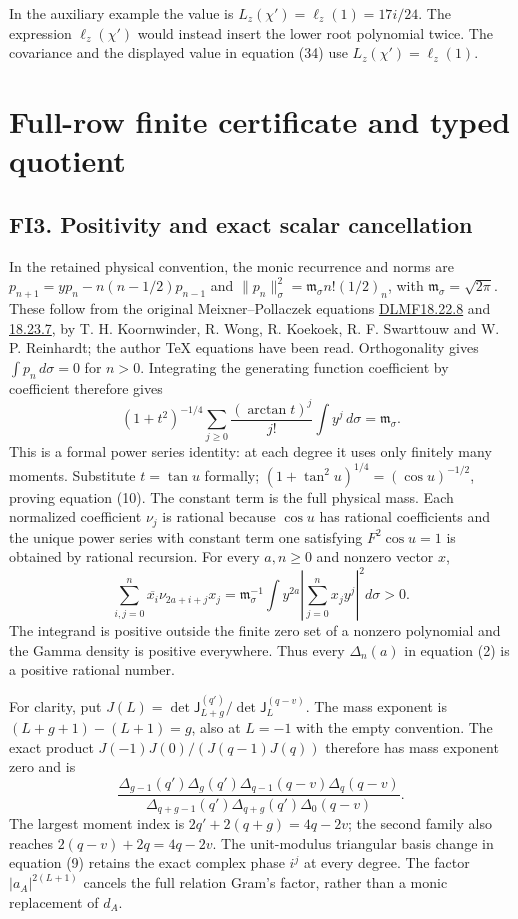 \documentclass[11pt]{article}
\begin{document}
In the auxiliary example the value is \(L_z(\chi')=\ell_z(1)=17i/24\). The expression \(\ell_z(\chi')\) would instead insert the lower root polynomial twice. The covariance and the displayed value in equation (34) use \(L_z(\chi')=\ell_z(1)\).

\section{Full-row finite certificate and typed quotient}\label{full-row-finite-certificate-and-typed-quotient}

\subsection{FI3. Positivity and exact scalar cancellation}\label{fi3.-positivity-and-exact-scalar-cancellation}

In the retained physical convention, the monic recurrence and norms are \(p_{n+1}=yp_n-n(n-1/2)p_{n-1}\) and \(\|p_n\|_\sigma^2=\mathfrak m_\sigma n!(1/2)_n\), with \(\mathfrak m_\sigma=\sqrt{2\pi}\). These follow from the original Meixner--Pollaczek equations \href{https://dlmf.nist.gov/18.22.E8}{DLMF18.22.8} and \href{https://dlmf.nist.gov/18.23.E7}{18.23.7}, by T. H. Koornwinder, R. Wong, R. Koekoek, R. F. Swarttouw and W. P. Reinhardt; the author TeX equations have been read. Orthogonality gives \(\int p_n\,d\sigma=0\) for \(n>0\). Integrating the generating function coefficient by coefficient therefore gives \[
 (1+t^2)^{-1/4}\sum_{j\ge0}\frac{(\arctan t)^j}{j!}\int y^j\,d\sigma=\mathfrak m_\sigma.
\] This is a formal power series identity: at each degree it uses only finitely many moments. Substitute \(t=\tan u\) formally; \((1+\tan^2u)^{1/4}=(\cos u)^{-1/2}\), proving equation (10). The constant term is the full physical mass. Each normalized coefficient \(\nu_j\) is rational because \(\cos u\) has rational coefficients and the unique power series with constant term one satisfying \(F^2\cos u=1\) is obtained by rational recursion. For every \(a,n\ge0\) and nonzero vector \(x\), \[
 \sum_{i,j=0}^n\overline{x_i}\nu_{2a+i+j}x_j
 =\mathfrak m_\sigma^{-1}\int y^{2a}\left|\sum_{j=0}^nx_jy^j\right|^2d\sigma>0.
 \tag{FI9}
\] The integrand is positive outside the finite zero set of a nonzero polynomial and the Gamma density is positive everywhere. Thus every \(\Delta_n(a)\) in equation (2) is a positive rational number.

For clarity, put \(J(L)=\det\mathsf J_{L+g}^{(q')}/\det\mathsf J_L^{(q-v)}\). The mass exponent is \((L+g+1)-(L+1)=g\), also at \(L=-1\) with the empty convention. The exact product \(J(-1)J(0)/(J(q-1)J(q))\) therefore has mass exponent zero and is \[
 \frac{\Delta_{g-1}(q')\Delta_g(q')\Delta_{q-1}(q-v)\Delta_q(q-v)}{\Delta_{q+g-1}(q')\Delta_{q+g}(q')\Delta_0(q-v)}.
 \tag{FI10}
\] The largest moment index is \(2q'+2(q+g)=4q-2v\); the second family also reaches \(2(q-v)+2q=4q-2v\). The unit-modulus triangular basis change in equation (9) retains the exact complex phase \(i^j\) at every degree. The factor \(|a_A|^{2(L+1)}\) cancels the full relation Gram's factor, rather than a monic replacement of \(d_A\).
\end{document}
